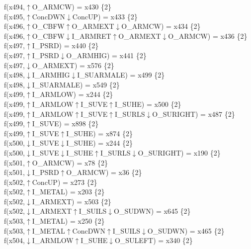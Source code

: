f(x494,$\uparrow$O\_ARMCW) = x430 \{2\} \\  
f(x495,$\uparrow$ConcDWN$\downarrow$ConcUP) = x433 \{2\} \\  
f(x496,$\uparrow$O\_CBFW$\uparrow$O\_ARMEXT$\downarrow$O\_ARMCW) = x434 \{2\} \\  
f(x496,$\uparrow$O\_CBFW$\downarrow$I\_ARMRET$\uparrow$O\_ARMEXT$\downarrow$O\_ARMCW) = x436 \{2\} \\  
f(x497,$\uparrow$I\_PSRD) = x440 \{2\} \\  
f(x497,$\uparrow$I\_PSRD$\downarrow$O\_ARMHIG) = x441 \{2\} \\  
f(x497,$\downarrow$O\_ARMEXT) = x576 \{2\} \\  
f(x498,$\downarrow$I\_ARMHIG$\downarrow$I\_SUARMALE) = x499 \{2\} \\  
f(x498,$\downarrow$I\_SUARMALE) = x549 \{2\} \\  
f(x499,$\uparrow$I\_ARMLOW) = x244 \{2\} \\  
f(x499,$\uparrow$I\_ARMLOW$\uparrow$I\_SUVE$\uparrow$I\_SUHE) = x500 \{2\} \\  
f(x499,$\uparrow$I\_ARMLOW$\uparrow$I\_SUVE$\uparrow$I\_SURLS$\downarrow$O\_SURIGHT) = x487 \{2\} \\  
f(x499,$\uparrow$I\_SUVE) = x898 \{2\} \\  
f(x499,$\uparrow$I\_SUVE$\uparrow$I\_SUHE) = x874 \{2\} \\  
f(x500,$\downarrow$I\_SUVE$\downarrow$I\_SUHE) = x244 \{2\} \\  
f(x500,$\downarrow$I\_SUVE$\downarrow$I\_SUHE$\uparrow$I\_SURLS$\downarrow$O\_SURIGHT) = x190 \{2\} \\  
f(x501,$\uparrow$O\_ARMCW) = x78 \{2\} \\  
f(x501,$\downarrow$I\_PSRD$\uparrow$O\_ARMCW) = x36 \{2\} \\  
f(x502,$\uparrow$ConcUP) = x273 \{2\} \\  
f(x502,$\uparrow$I\_METAL) = x203 \{2\} \\  
f(x502,$\downarrow$I\_ARMEXT) = x503 \{2\} \\  
f(x502,$\downarrow$I\_ARMEXT$\uparrow$I\_SUILS$\downarrow$O\_SUDWN) = x645 \{2\} \\  
f(x503,$\uparrow$I\_METAL) = x250 \{2\} \\  
f(x503,$\uparrow$I\_METAL$\uparrow$ConcDWN$\uparrow$I\_SUILS$\downarrow$O\_SUDWN) = x465 \{2\} \\  
f(x504,$\downarrow$I\_ARMLOW$\uparrow$I\_SUHE$\downarrow$O\_SULEFT) = x340 \{2\} \\  
